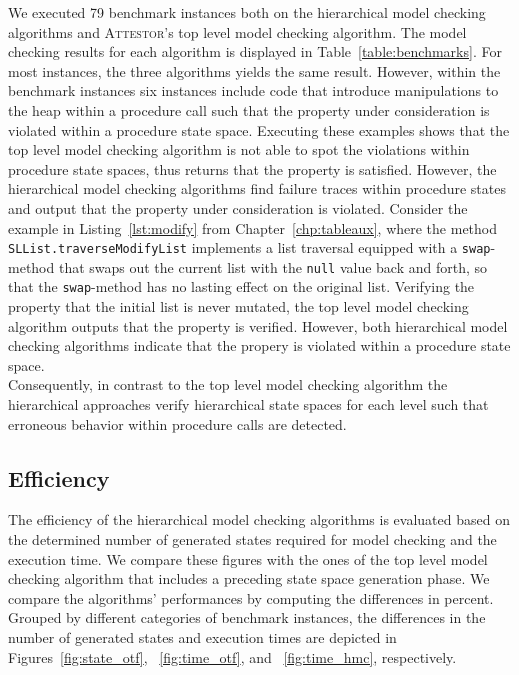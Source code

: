 \documentclass[a4paper, 12pt, twoside]{report}
\begin{document}
	We executed 79 benchmark instances both on the hierarchical model checking algorithms and \textsc{Attestor}'s top level model checking algorithm. The model checking results for each algorithm is displayed in Table~\ref{table:benchmarks}. For most instances, the three algorithms yields the same result. However, within the benchmark instances six instances include code that introduce manipulations to the heap within a procedure call such that the property under consideration is violated within a procedure state space. Executing these examples shows that the top level model checking algorithm is not able to spot the violations within procedure state spaces, thus returns that the property is satisfied. However, the hierarchical model checking algorithms find failure traces within procedure states and output that the property under consideration is violated. Consider the example in Listing~\ref{lst:modify} from Chapter~\ref{chp:tableaux},  where the method \texttt{SLList.traverseModifyList} implements a list traversal equipped with a \texttt{swap}-method that swaps out the current list with the \texttt{null} value back and forth, so that the \texttt{swap}-method has no lasting effect on the original list. Verifying the property that the initial list is never mutated, the top level model checking algorithm outputs that the property is verified. However, both hierarchical model checking algorithms indicate that the propery is violated within a procedure state space.\\
		
	Consequently, in contrast to the top level model checking algorithm the hierarchical approaches verify hierarchical state spaces for each level such that erroneous behavior within procedure calls are detected.
	
	\subsection{Efficiency}

	The efficiency of the hierarchical model checking algorithms is evaluated based on the determined number of generated states required for model checking and the execution time. We compare these figures with the ones of the top level model checking algorithm that includes a preceding state space generation phase. We compare the algorithms' performances by computing the differences in percent. Grouped by different categories of benchmark instances, the differences in the number of generated states and execution times are depicted in Figures~\ref{fig:state_otf}, ~\ref{fig:time_otf}, and ~\ref{fig:time_hmc}, respectively.\\
	
\end{document}
